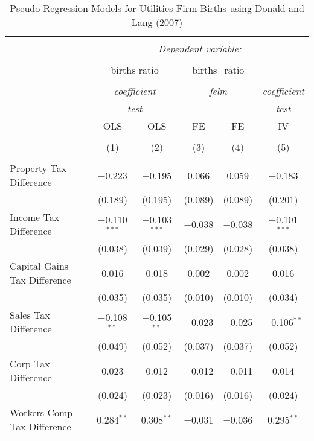 
\begin{table}[!htbp] \centering 
  \caption{Pseudo-Regression Models for  Utilities Firm Births using Donald and Lang (2007)} 
  \label{} 
\begin{tabular}{@{\extracolsep{5pt}}lccccc} 
\\[-1.8ex]\hline 
\hline \\[-1.8ex] 
 & \multicolumn{5}{c}{\textit{Dependent variable:}} \\ 
\cline{2-6} 
\\[-1.8ex] & \multicolumn{2}{c}{births ratio} & \multicolumn{2}{c}{births\_ratio} &   \\ 
\\[-1.8ex] & \multicolumn{2}{c}{\textit{coefficient}} & \multicolumn{2}{c}{\textit{felm}} & \textit{coefficient} \\ 
 & \multicolumn{2}{c}{\textit{test}} & \multicolumn{2}{c}{\textit{}} & \textit{test} \\ 
 & OLS & OLS & FE & FE & IV \\ 
\\[-1.8ex] & (1) & (2) & (3) & (4) & (5)\\ 
\hline \\[-1.8ex] 
 Property Tax Difference & $-$0.223 & $-$0.195 & 0.066 & 0.059 & $-$0.183 \\ 
  & (0.189) & (0.195) & (0.089) & (0.089) & (0.201) \\ 
  Income Tax Difference & $-$0.110$^{***}$ & $-$0.103$^{***}$ & $-$0.038 & $-$0.038 & $-$0.101$^{***}$ \\ 
  & (0.038) & (0.039) & (0.029) & (0.028) & (0.038) \\ 
  Capital Gains Tax Difference & 0.016 & 0.018 & 0.002 & 0.002 & 0.016 \\ 
  & (0.035) & (0.035) & (0.010) & (0.010) & (0.034) \\ 
  Sales Tax Difference & $-$0.108$^{**}$ & $-$0.105$^{**}$ & $-$0.023 & $-$0.025 & $-$0.106$^{**}$ \\ 
  & (0.049) & (0.052) & (0.037) & (0.037) & (0.052) \\ 
  Corp Tax Difference & 0.023 & 0.012 & $-$0.012 & $-$0.011 & 0.014 \\ 
  & (0.024) & (0.023) & (0.016) & (0.016) & (0.024) \\ 
  Workers Comp Tax Difference & 0.284$^{**}$ & 0.308$^{**}$ & $-$0.031 & $-$0.036 & 0.295$^{**}$ \\ 

\end{tabular}
\end{table}
